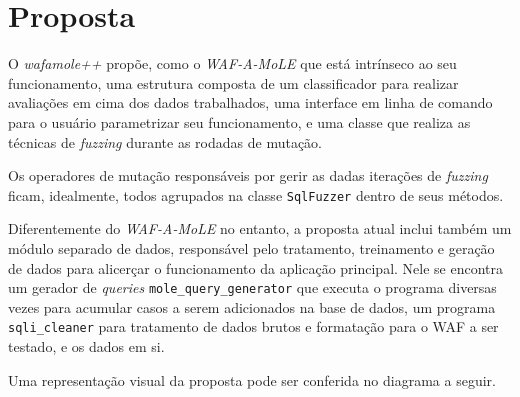 \section{Proposta}

O \textit{wafamole++} propõe, como o \textit{WAF-A-MoLE} que está intrínseco ao seu funcionamento, uma estrutura composta de um classificador para realizar avaliações em cima dos dados trabalhados, uma interface em linha de comando para o usuário parametrizar seu funcionamento, e uma classe que realiza as técnicas de \textit{fuzzing} durante as rodadas de mutação.

Os operadores de mutação responsáveis por gerir as dadas iterações de \textit{fuzzing} ficam, idealmente, todos agrupados na classe \verb+SqlFuzzer+ dentro de seus métodos.

Diferentemente do \textit{WAF-A-MoLE} no entanto, a proposta atual inclui também um módulo separado de dados, responsável pelo tratamento, treinamento e geração de dados para alicerçar o funcionamento da aplicação principal. Nele se encontra um gerador de \textit{queries} \verb+mole_query_generator+ que executa o programa diversas vezes para acumular casos a serem adicionados na base de dados, um programa \verb+sqli_cleaner+ para tratamento de dados brutos e formatação para o WAF a ser testado, e os dados em si.

Uma representação visual da proposta pode ser conferida no diagrama a seguir.

